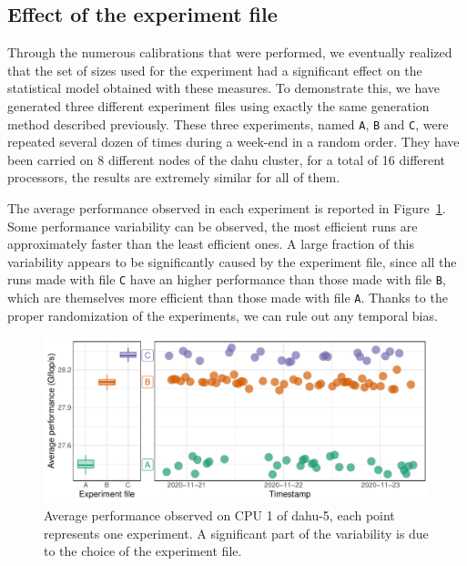         \subsection{Effect of the experiment file}%
        \label{sub:effect_experiment_file}

            Through the numerous \dgemm calibrations that were performed, we eventually realized that the set of sizes
            used for the experiment had a significant effect on the statistical model obtained with these measures. To
            demonstrate this, we have generated three different experiment files using exactly the same generation
            method described previously. These three experiments, named \texttt{A}, \texttt{B} and \texttt{C}, were
            repeated several dozen of times during a week-end in a random order. They have been carried on 8 different
            nodes of the dahu cluster, for a total of 16 different processors, the results are extremely similar for all
            of them.

            The average \dgemm performance observed in each experiment is reported in
            Figure~\ref{fig:randomizing_sizes:expfile:average_perf}. Some performance variability can be observed, the
            most efficient runs are approximately  faster than the least efficient ones. A large
            fraction of this variability appears to be significantly caused by the experiment file, since all the runs
            made with file \texttt{C} have an higher performance than those made with file \texttt{B}, which are
            themselves more efficient than those made with file \texttt{A}. Thanks to the proper randomization of the
            experiments, we can rule out any temporal bias.

            \begin{figure}[htpb]
                \centering
                \includegraphics[width=\linewidth]{img/experiment/randomizing_sizes/expfile/average_performance.pdf}
                \caption{Average performance observed on CPU 1 of dahu-5, each point represents one experiment. A
                significant part of the variability is due to the choice of the experiment file.}%
                \label{fig:randomizing_sizes:expfile:average_perf}
            \end{figure}

